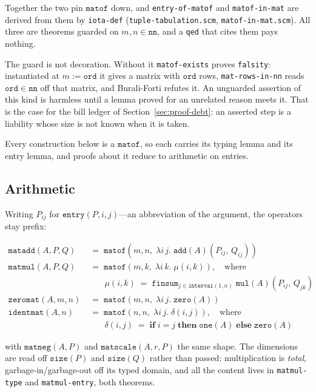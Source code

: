 \noindent
Together the two pin $\mathtt{matof}$ down, and \texttt{entry-of-matof}
and \texttt{matof-in-mat} are derived from them by \texttt{iota-def}
(\texttt{tuple-tabulation.scm}, \texttt{matof-in-mat.scm}).  All three
are theorems guarded on $m, n \in \mathtt{nn}$, and a \texttt{qed} that
cites them pays nothing.

The guard is not decoration.  Without it \texttt{matof-exists} proves
\texttt{falsity}: instantiated at $m := \mathtt{ord}$ it gives a matrix
with $\mathtt{ord}$ rows, \texttt{mat-rows-in-nn} reads
$\mathtt{ord} \in \mathtt{nn}$ off that matrix, and Burali-Forti refutes
it.  An unguarded assertion of this kind is
harmless until a lemma proved for an unrelated reason meets it.  That
is the case for the bill ledger of Section~\ref{sec:proof-debt}: an
asserted step is a liability whose size is not known when it is taken.

Every construction below is a $\mathtt{matof}$, so each carries its
typing lemma and its entry lemma, and proofs about it reduce to
arithmetic on entries.

\subsection{Arithmetic}

Writing $P_{ij}$ for $\mathtt{entry}(P,i,j)$---an abbreviation of the
argument, the operators stay prefix:

\begin{align*}
\mathtt{matadd}(A, P, Q) &\;=\;
  \mathtt{matof}(m, n,\; \lambda i\, j.\;
     \mathtt{add}(A)(P_{ij},\, Q_{ij})) \\
\mathtt{matmul}(A, P, Q) &\;=\;
  \mathtt{matof}(m, k,\; \lambda i\, k.\; \mu(i,k)),
  \quad\text{where} \\
 &\qquad \mu(i,k) \;=\;
     \textstyle\mathtt{finsum}_{j \in \mathtt{interval}(1,n)}\;
     \mathtt{mul}(A)(P_{ij},\, Q_{jk}) \\
\mathtt{zeromat}(A, m, n) &\;=\;
  \mathtt{matof}(m, n,\; \lambda i\, j.\; \mathtt{zero}(A)) \\
\mathtt{identmat}(A, n) &\;=\;
  \mathtt{matof}(n, n,\; \lambda i\, j.\; \delta(i,j)),
  \quad\text{where} \\
 &\qquad \delta(i,j) \;=\;
     \mathbf{if}\; i = j \;\mathbf{then}\; \mathtt{one}(A)
     \;\mathbf{else}\; \mathtt{zero}(A)
\end{align*}

\noindent
with $\mathtt{matneg}(A,P)$ and $\mathtt{matscale}(A,r,P)$ the same
shape.  The dimensions are read off $\mathtt{size}(P)$ and
$\mathtt{size}(Q)$ rather than passed: multiplication is
\emph{total}, garbage-in/garbage-out off its typed domain, and all the
content lives in \texttt{matmul-type} and \texttt{matmul-entry}, both
theorems.

